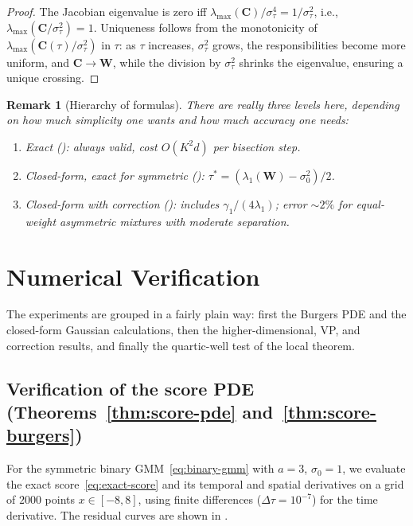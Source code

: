 \documentclass[11pt]{article}
\newtheorem{remark}[theorem]{Remark}
\begin{document}
\begin{proof}
The Jacobian eigenvalue is zero iff $\lambda_{\max}(\bm{C})/\sigma_\tau^4 = 1/\sigma_\tau^2$, i.e., $\lambda_{\max}(\bm{C}/\sigma_\tau^2) = 1$.
Uniqueness follows from the monotonicity of $\lambda_{\max}(\bm{C}(\tau)/\sigma_\tau^2)$ in $\tau$: as $\tau$ increases, $\sigma_\tau^2$ grows, the responsibilities become more uniform, and $\bm{C} \to \bm{W}$, while the division by $\sigma_\tau^2$ shrinks the eigenvalue, ensuring a unique crossing.
\end{proof}

\begin{remark}[Hierarchy of formulas]\label{rem:hierarchy}
There are really three levels here, depending on how much simplicity one wants and how much accuracy one needs:
\begin{enumerate}[nosep]
\item \emph{Exact} (): always valid, cost $O(K^2 d)$ per bisection step.
\item \emph{Closed-form, exact for symmetric} (): $\tau^\ast = (\lambda_1(\bm{W}) - \sigma_0^2)/2$.
\item \emph{Closed-form with correction} (): includes $\gamma_1/(4\lambda_1)$; error ${\sim}2\%$ for equal-weight asymmetric mixtures with moderate separation.
\end{enumerate}
\end{remark}


\section{Numerical Verification}\label{sec:experiments}

The experiments are grouped in a fairly plain way: first the Burgers PDE and the closed-form Gaussian calculations, then the higher-dimensional, VP, and correction results, and finally the quartic-well test of the local theorem.

\subsection{Verification of the score PDE (Theorems~\ref{thm:score-pde} and~\ref{thm:score-burgers})}\label{sec:exp:pde}

For the symmetric binary GMM~\eqref{eq:binary-gmm} with $a = 3$, $\sigma_0 = 1$, we evaluate the exact score~\eqref{eq:exact-score} and its temporal and spatial derivatives on a grid of $2000$ points $x \in [-8,8]$, using finite differences ($\Delta\tau = 10^{-7}$) for the time derivative.
The residual curves are shown in .
\end{document}
